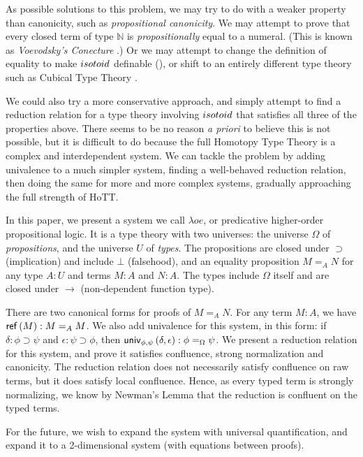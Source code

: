 As possible solutions to this problem, we may try to do with a weaker property than canonicity, such as \emph{propositional canonicity}.
We may attempt to prove that every closed term of type $\mathbb{N}$ is \emph{propositionally} equal to a numeral.  (This is known as
\emph{Voevodsky's Conecture} .)  Or we may attempt to change the definition of equality to make $isotoid$ definable (\cite{Polonsky14a}), or
shift to an entirely different type theory such as Cubical Type Theory .

We could also try a more conservative approach, and simply attempt to find a reduction relation for a type theory involving $isotoid$ that satisfies
all three of the properties above.  There seems to be no reason \emph{a priori} to believe this is not possible, but it is difficult to do because
the full Homotopy Type Theory is a complex and interdependent system.  We can tackle the problem by adding univalence to a much simpler system, finding
a well-behaved reduction relation, then doing the same for more and more complex systems, gradually approaching the full strength of HoTT.

In this paper, we present a system we call $\lambda o e$, or predicative higher-order propositional logic.  It is a type theory with two universes: the universe $\Omega$
of \emph{propositions}, and the universe $U$ of \emph{types}.  The propositions are closed under $\supset$ (implication) and include $\bot$ (falsehood), and an equality proposition $M =_A N$ for
any type $A : U$ and terms $M : A$ and $N : A$.  The types include $\Omega$ itself and are closed under $\rightarrow$ (non-dependent function type).

There are two canonical forms for proofs of $M =_A N$.  For any term $M : A$, we have $\mathsf{ref} \left( {M} \right) : M =_A M$.  We also add univalence for this system, in this form:
if $\delta : \phi \supset \psi$ and $\epsilon : \psi \supset\phi$, then $\mathsf{univ}_{{\phi} , {\psi}} \left( {\delta} , {\epsilon} \right) : \phi =_\Omega \psi$.  We present a reduction relation for this system, and prove it satisfies confluence, strong normalization and canonicity.   The reduction relation does not necessarily satisfy confluence on raw terms, but it does satisfy local confluence.  Hence, as
every typed term is strongly normalizing, we know by Newman's Lemma that the reduction is confluent on the typed terms.

For the future, we wish to expand the system with universal quantification, and expand it to a 2-dimensional system (with equations between proofs).

